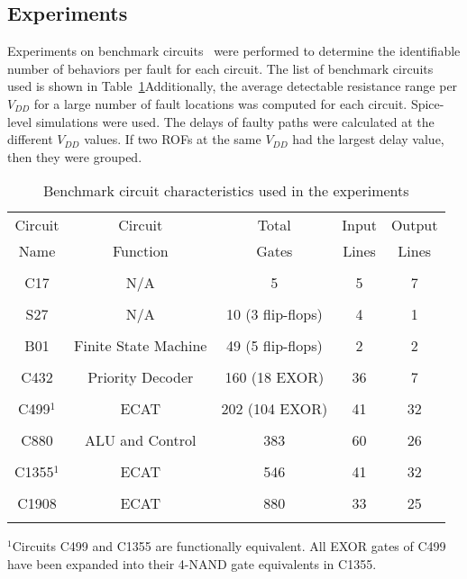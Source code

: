 \subsection{Experiments}
\label{JP2_subsec_BenchmarkExp}


Experiments on benchmark circuits~\cite{F.Brglez-85,F.Brglez-89,F.corno-00} were performed to determine the identifiable number of behaviors per fault for each circuit. The list of benchmark circuits used is shown in Table~\ref{tb:iscas85}Additionally, the average detectable resistance range per $V_{DD}$ for a large number of fault locations was computed for each circuit. Spice-level simulations were used. The delays of faulty paths were calculated at the different $V_{DD}$ values. If two ROFs at the same $V_{DD}$  had the largest delay value, then they were grouped. 


\begin{table}[hbtp]
\centering
\caption{Benchmark circuit characteristics used in the experiments}
\label{tb:iscas85}
\begin{tabular}{|c||c|c|c|c|} \hline
Circuit & Circuit & Total & Input & Output  \\
Name    & Function & Gates & Lines & Lines \\ \hline
        &          &       &      &         \\
C17	& N/A & 5 & 5   & 7       \\
        &          &       &      &         \\
S27	& N/A & 10 (3 flip-flops) & 4   & 1       \\
        &          &       &      &         \\
B01	& Finite State Machine & 49 (5 flip-flops) & 2   & 2       \\
        &          &       &      &         \\
C432	& Priority Decoder & 160 (18 EXOR)  & 36   & 7       \\
        &          &       &      &         \\
C499$^1$ & ECAT     & 202 (104 EXOR) & 41   & 32     \\
        &          &       &      &         \\
C880    & ALU and Control  & 383   & 60   & 26      \\
        &          &       &      &         \\
C1355$^1$ & ECAT     & 546   & 41   & 32      \\
        &          &       &      &         \\
C1908   & ECAT     & 880   & 33   & 25      \\
        &          &       &      &        \\
\hline
\end{tabular}

\raggedright 
\hspace{0.8in}
\parbox{4.8in}{  
$^1$Circuits C499 and C1355 are functionally equivalent.
All EXOR gates of C499 have been expanded into their
4-NAND gate equivalents in C1355. \cite{M.Pedram-02}
}

\end{table}

